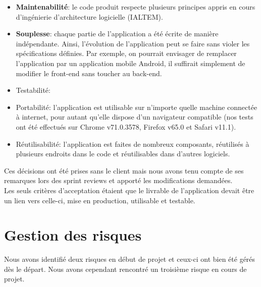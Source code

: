 \documentclass[t, 12pt, usenames,dvipsnames]{article}
\begin{document}
\begin{itemize}
            \item \textbf{Maintenabilité}: le code produit respecte plusieurs principes appris en cours d'ingénierie d'architecture logicielle (IALTEM).
            \item \textbf{Souplesse}: chaque partie de l'application a été écrite de manière indépendante. Ainsi, l'évolution de l'application peut se faire sans violer les spécifications définies. Par exemple, on pourrait envisager de remplacer l'application par un application mobile Android, il suffirait simplement de modifier le front-end sans toucher au back-end.
            \item Testabilité:
            \item Portabilité: l'application est utilisable sur n'importe quelle machine connectée à internet, pour autant qu'elle dispose d'un navigateur compatible (nos tests ont été effectués sur Chrome v71.0.3578, Firefox v65.0 et Safari v11.1).
            \item Réutilisabilité: l'application est faites de nombreux composants, réutilisés à plusieurs endroits dans le code et réutilisables dans d'autres logiciels.
        \end{itemize}
        
        \noindent Ces décisions ont été prises sans le client mais nous avons tenu compte de ses remarques lors des sprint reviews et apporté les modifications demandées.\\
        Les seuls critères d'acceptation étaient que le livrable de l'application devait être un lien vers celle-ci, mise en production, utilisable et testable.
        
    

    \newpage

    \section{Gestion des risques}
    \noindent Nous avons identifié deux risques en début de projet et ceux-ci ont bien été gérés dès le départ. Nous avons cependant rencontré un troisième risque en cours de projet. 
    
\end{document}
